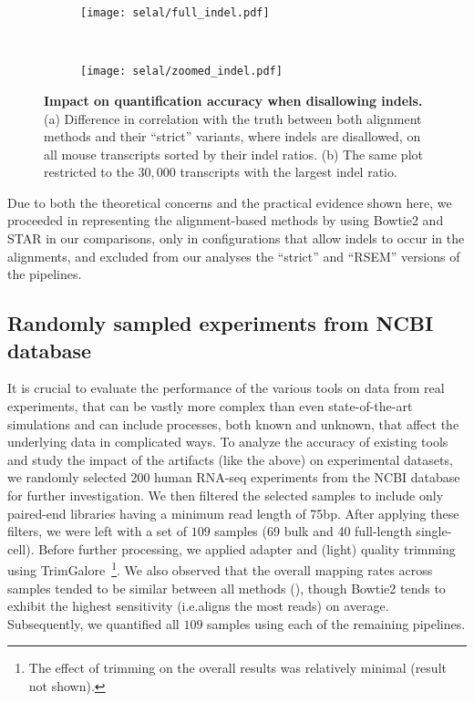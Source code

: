 \begin{figure}[t!]
    \centering
    \begin{subfigure}[t]{0.45\textwidth}
        \centering
	    \texttt{[image: selal/full\_indel.pdf]}
      \caption{\label{subfig:indel_strat_full}}
    \end{subfigure}
    ~
    \begin{subfigure}[t]{0.45\textwidth}
        \centering
	    \texttt{[image: selal/zoomed\_indel.pdf]}
      \caption{\label{subfig:indel_strat_zoomed}}
    \end{subfigure}
    \caption{\textbf{Impact on quantification accuracy when disallowing indels.} (a) Difference in correlation with the truth between both alignment
      methods and their ``strict'' variants, where indels are disallowed, on all mouse transcripts sorted by their indel ratios. (b) The same plot restricted
      to the $30,000$ transcripts with the largest indel ratio.}
    \label{fig:indelcorr}
\end{figure}

Due to both the theoretical concerns and the practical evidence shown here, we
proceeded in representing the alignment-based methods by using Bowtie2 and STAR in
our comparisons, only in configurations that allow indels to occur in the
alignments, and excluded from our analyses the ``strict'' and ``RSEM'' versions of the pipelines. 

\subsection{Randomly sampled experiments from NCBI database}
\label{subsec:experimental}

It is crucial to evaluate the performance of the various tools on data from real
experiments, that can be vastly more complex than even state-of-the-art simulations
and can include processes, both known and unknown, that affect the underlying
data in complicated ways. To analyze the accuracy of existing tools and study
the impact of the artifacts (like the above) on experimental datasets, we
randomly selected 200 human RNA-seq experiments from the NCBI database
for further investigation. We then filtered the selected samples to include
only paired-end libraries having a minimum read length of 75bp. After applying
these filters, we were left with a set of $109$ samples (69 bulk and 40 full-length single-cell). Before further
processing, we applied adapter and (light) quality trimming using TrimGalore~\citep{trimgalore, cutadapt}\footnote{The effect of trimming on the overall results was
relatively minimal (result not shown).}. We also observed that the overall mapping
rates across samples tended to be similar between all methods
(), though Bowtie2 tends to exhibit the highest sensitivity
(i.e.\@ aligns the most reads) on average.
Subsequently, we quantified all $109$ samples using each of the remaining pipelines.

